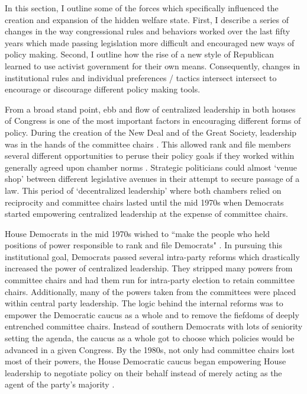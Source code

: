 \documentclass[12pt]{article}
\begin{document}
In this section, I outline some of the forces which specifically influenced the creation and expansion of the hidden welfare state. First, I describe a series of changes in the way congressional rules and behaviors worked over the last fifty years which made passing legislation more difficult and encouraged new ways of policy making. Second, I outline how the rise of a new style of Republican learned to use activist government for their own means. Consequently, changes in institutional rules and individual preferences / tactics intersect intersect to encourage or discourage different policy making tools.

From a broad stand point, ebb and flow of centralized leadership in both houses of Congress is one of the most important factors in encouraging different forms of policy. During the creation of the New Deal and of the Great Society, leadership was in the hands of the committee chairs \citep{shepsle1989}. This allowed rank and file members several different opportunities to peruse their policy goals if they worked within generally agreed upon chamber norms \citep{matthews1960, asher1973}. Strategic politicians could almost `venue shop' between different legislative avenues in their attempt to secure passage of a law. This period of `decentralized leadership' where both chambers relied on reciprocity and committee chairs lasted until the mid 1970s when Democrats started empowering centralized leadership at the expense of committee chairs.

House Democrats in the mid 1970s wished to ``make the people who held positions of power responsible to rank and file Democrats" \citep[pg. 26, quote spoken by Rep. Donald Fraser (D-MN)]{rohde1991}. In pursuing this institutional goal, Democrats passed several intra-party reforms which drastically increased the power of centralized leadership. They stripped many powers from committee chairs and had them run for intra-party election to retain committee chairs. Additionally, many of the powers taken from the committees were placed within central party leadership. The logic behind the internal reforms was to empower the Democratic caucus as a whole and to remove the fiefdoms of deeply entrenched committee chairs. Instead of southern Democrats with lots of seniority setting the agenda, the caucus as a whole got to choose which policies would be advanced in a given Congress. By the 1980s, not only had committee chairs lost most of their powers, the House Democratic caucus began empowering House leadership to negotiate policy on their behalf instead of merely acting as the agent of the party's majority \citep{sinclair1983, palazzolo1992, sinclair1998}.
\end{document}
